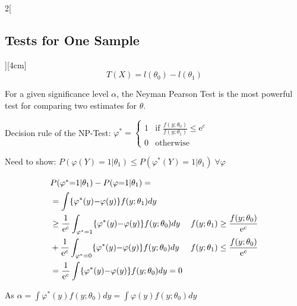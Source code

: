 \documentclass[8pt]{extarticle}
\begin{document}
\begin{multicols}{2}[\subsection{Tests for One Sample}][4cm]
  $$T(X) = l(\theta_0) - l(\theta_1)$$
  
  \noindent For a given significance level $\alpha$, the Neyman Pearson Test is the most powerful test for comparing two estimates for $\theta$.
  
\begin{Proof}
Decision rule of the NP-Test: $\varphi^* {=} \begin{cases} 1 & \text{if } \frac{f(y;\theta_0)}{f(y;\theta_1)} \leq \mathrm{e}^c\\ 0 & \text{otherwise} \end{cases}$

\noindent Need to show: $P(\varphi(Y) {=} 1|\theta_1) \leq P(\varphi^*(Y) {=} 1|\theta_1)\; \forall \varphi$ 

\begin{align*}
\intertext{$P(\varphi^* {=} 1|\theta_1) - P(\varphi {=} 1|\theta_1) = $}
&= \int \{\varphi^*(y) {-} \varphi(y)\} f(y;\theta_1)dy\\
&\geq \frac{1}{\mathrm{e}^c} \int_{\varphi^*{=}1} \{\varphi^*(y) {-} \varphi(y)\}f(y;\theta_0)dy & f(y;\theta_1) \geq \frac{f(y;\theta_0)}{\mathrm{e}^c} \\
&+ \frac{1}{\mathrm{e}^c} \int_{\varphi^*{=}0} \{\varphi^*(y) {-} \varphi(y)\}f(y;\theta_0)dy & f(y;\theta_1) \leq \frac{f(y;\theta_0)}{\mathrm{e}^c} \\
&= \frac{1}{\mathrm{e}^c} \int \{\varphi^*(y) {-} \varphi(y)\}f(y;\theta_0)dy = 0
\end{align*}

\noindent As $\alpha = \int \varphi^*(y)f(y;\theta_0)dy = \int \varphi(y)f(y;\theta_0)dy$
\end{Proof}


\end{multicols}


\end{document}
